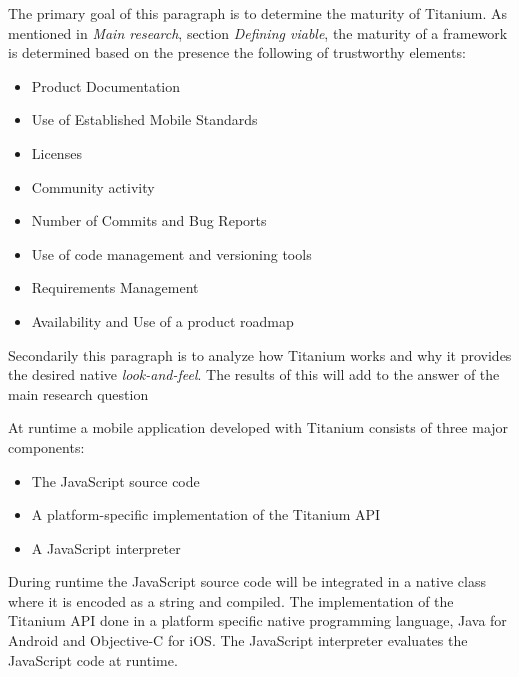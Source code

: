 



\noindent The primary goal of this paragraph is to determine the maturity of Titanium. As mentioned in \emph{Main research}, section \emph{Defining viable}, the maturity of a framework is determined based on the presence the following of trustworthy elements:

\begin{itemize}
  \setlength{\itemsep}{1pt}
  \setlength{\parskip}{0pt}
  \setlength{\parsep}{0pt}
\item Product Documentation
\item Use of Established Mobile Standards
\item Licenses
\item Community activity
\item Number of Commits and Bug Reports
\item Use of code management and versioning tools
\item Requirements Management
\item Availability and Use of a product roadmap
\end{itemize}

Secondarily this paragraph is to analyze how Titanium works and why it provides the desired native \emph{look-and-feel}. The results of this will add to the answer of the main research question






At runtime a mobile application developed with Titanium consists of three major components:
\begin{itemize}
	\item
	The JavaScript source code
	\item
	A platform-specific implementation of the Titanium API
	\item
	A JavaScript interpreter
\end{itemize}

During runtime the JavaScript source code will be integrated in a native class where it is encoded as a string and compiled. The implementation of the Titanium API done in a platform specific native programming language, Java for Android and Objective-C for iOS. The JavaScript interpreter evaluates the JavaScript code at runtime.


